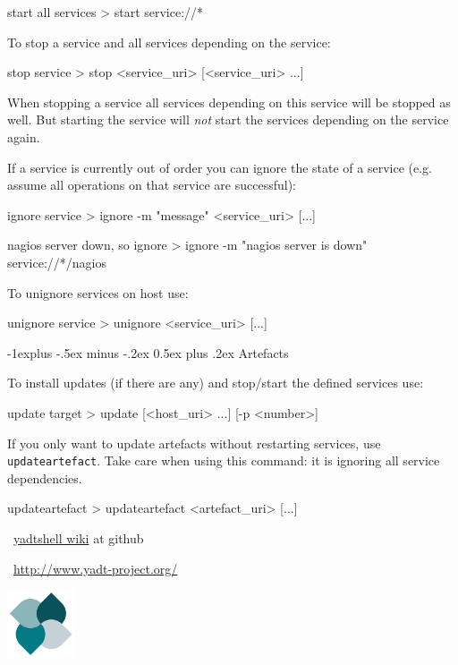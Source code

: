 \documentclass[10pt,landscape]{article}
\makeatletter
\renewcommand{\subsection}{\@startsection{subsection}{2}{0mm}%
                                {-1explus -.5ex minus -.2ex}%
                                {0.5ex plus .2ex}%
                                {\normalfont\normalsize\bfseries}}
\newcommand{\note}[2][Note]{
\begin{description}[font=\bfseries,leftmargin=1cm,style=sameline]
    \item [{#1}] {#2}
\end{description}
}
\makeatother
\begin{document}
\begin{multicols}{3}
\begin{examples}{start all services}
> start service://*
\end{examples}

To stop a service and all services depending on the service:
\begin{commands}{stop service}
> stop <service_uri> [<service_uri> ...]
\end{commands}

\note{When stopping a service all services depending on this service will be
stopped as well. But starting the service will \emph{not} start the services
depending on the service again.}


If a service is currently out of order you can ignore the state of a service
(e.g. assume all operations on that service are successful):
\begin{commands}{ignore service}
> ignore -m "message" <service_uri> [...]
\end{commands}

\begin{examples}{nagios server down, so ignore}
> ignore -m "nagios server is down" service://*/nagios
\end{examples}

To unignore services on host use:
\begin{commands}{unignore service}
> unignore <service_uri> [...]
\end{commands}



\subsection{Artefacts}

To install updates (if there are any) and stop/start the defined services use:
\begin{commands}{update target}
> update [<host_uri> ...] [-p <number>]
\end{commands}


If you only want to update artefacts without restarting services,
use \verb+updateartefact+. Take care when using this command:
it is ignoring all service dependencies.
\begin{commands}{updateartefact}
> updateartefact <artefact_uri> [...]
\end{commands}



\begin{minipage}[b]{5cm}
~\hfill\href{https://github.com/yadt/yadtshell/wiki}{yadtshell wiki} at github

~\hfill\href{http://www.yadt-project.org/}{http://www.yadt-project.org/}
\end{minipage}%
\hfill%
\includegraphics[width=2cm,valign=b]{res/yadtlogo}%

\end{multicols}
\end{document}
